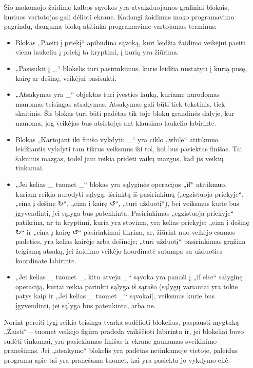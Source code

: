 \documentclass{VUMIFPSkursinis}
\begin{document}
Šio mokomojo žaidimo kalbos sąvokos yra atvaizduojamos grafiniai blokais, kuriuos vartotojas gali dėlioti ekrane. Kadangi žaidimas moko programavimo pagrindų, dauguma blokų atitinka programavime vartojamus terminus:
\begin{itemize}
    \item Blokas „Paeiti į priekį“ apibūdina sąvoką, kuri leidžia žaidimo veikėjui paeiti vienu laukeliu į priekį ta kryptimi, į kurią yra žiūrima.
    \item „Pasisukti į \_“ blokelis turi pasirinkimus, kurie leidžia nustatyti į kurią pusę, kairę ar dešinę, veikėjui pasisukti.
    \item „Atsakymas yra \_“ objektas turi įvesties lauką, kuriame nurodomas manomas teisingas atsakymas. Atsakymas gali būti tiek tekstinis, tiek skaitinis. Šis blokas turi būti padėtas tik toje blokų grandinės dalyje, kur manoma, jog veikėjas bus atsistojęs ant klausimo laukelio labirinte.
    \item Blokas „Kartojant iki finišo vykdyti: \_“ yra ciklo „while“ atitikmuo leidžiantis vykdyti tam tikrus veiksmus iki tol, kol bus pasiektas finišas. Tai šakninis mazgas, todėl jam reikia pridėti vaikų mazgus, kad jis veiktų tinkamai.
    \item „Jei kelias \_ tuomet \_“ blokas yra sąlyginės operacijos „if“ atitikmuo, kuriam reikia nurodyti sąlygą, išrinktą iš pasirinkimų („egzistuoja priekyje“, „eina į dešinę ↻“, „eina į kairę ↺“, „turi užduotį“), bei veiksmus kurie bus įgyvendinti, jei sąlyga bus patenkinta. Pasirinkimas „egzistuoja priekyje“ patikrina, ar ta kryptimi, kuria yra stovima, yra kelias priekyje; „eina į dešinę ↻“ ir „eina į kairę ↺“ pasirinkimai tikrina, ar, žiūrint nuo veikėjo esamos padėties, yra kelias kairėje arba dešinėje; „turi užduotį“ pasirinkimas grąžina teigiamą atsaką, jei žaidimo veikėjo koordinatė sutampa su užduoties koordinate labirinte.
    \item „Jei kelias \_ tuomet \_, kitu atveju \_“ sąvoka yra panaši į „if else“ salyginę operaciją, kuriai reikia parinkti sąlyga iš sąrašo (sąlygų variantai yra tokie patys kaip ir „Jei kelias \_ tuomet \_“ sąvokai), veiksmus kurie bus įgyvendinti, jei sąlyga bus patenkinta, arba ne.
\end{itemize}

Norint pereiti lygį reikia teisinga tvarka sudėlioti blokelius, paspausti mygtuką „Žaisti“ -- tuomet veikėjo figūra pradeda vaikščioti labirintu ir, jei blokeliai buvo sudėti tinkamai, yra pasiekiamas finišas ir ekrane gaunamas sveikinimo pranešimas. Jei „atsakymo“ blokelis yra padėtas netinkamoje vietoje, paleidus programą apie tai yra pranešama tuomet, kai yra pasiekta jo vykdymo eilė.
\end{document}
